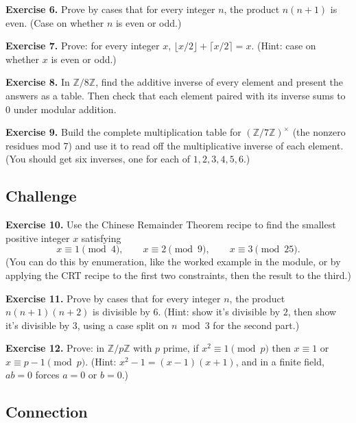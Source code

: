 \documentclass[11pt]{article}
\begin{document}
\textbf{Exercise 6.}\label{ex:m6:6} Prove by cases that for every integer $n$, the product $n(n + 1)$ is even. (Case on whether $n$ is even or odd.)

\bigskip
\textbf{Exercise 7.}\label{ex:m6:7} Prove: for every integer $x$, $\lfloor x / 2 \rfloor + \lceil x / 2 \rceil = x$. (Hint: case on whether $x$ is even or odd.)

\bigskip
\textbf{Exercise 8.}\label{ex:m6:8} In $\mathbb{Z}/8\mathbb{Z}$, find the additive inverse of every element and present the answers as a table. Then check that each element paired with its inverse sums to $0$ under modular addition.

\bigskip
\textbf{Exercise 9.}\label{ex:m6:9} Build the complete multiplication table for $(\mathbb{Z}/7\mathbb{Z})^{\times}$ (the nonzero residues mod 7) and use it to read off the multiplicative inverse of each element. (You should get six inverses, one for each of $1, 2, 3, 4, 5, 6$.)

\subsection*{Challenge}

\textbf{Exercise 10.}\label{ex:m6:10} Use the Chinese Remainder Theorem recipe to find the smallest positive integer $x$ satisfying
\[
  x \equiv 1 \pmod 4, \qquad x \equiv 2 \pmod 9, \qquad x \equiv 3 \pmod{25}.
\]
(You can do this by enumeration, like the worked example in the module, or by applying the CRT recipe to the first two constraints, then the result to the third.)

\bigskip
\textbf{Exercise 11.}\label{ex:m6:11} Prove by cases that for every integer $n$, the product $n(n+1)(n+2)$ is divisible by $6$. (Hint: show it's divisible by $2$, then show it's divisible by $3$, using a case split on $n \bmod 3$ for the second part.)

\bigskip
\textbf{Exercise 12.}\label{ex:m6:12} Prove: in $\mathbb{Z}/p\mathbb{Z}$ with $p$ prime, if $x^2 \equiv 1 \pmod p$ then $x \equiv 1$ or $x \equiv p - 1 \pmod p$. (Hint: $x^2 - 1 = (x - 1)(x + 1)$, and in a finite field, $ab = 0$ forces $a = 0$ or $b = 0$.)

\subsection*{Connection}
\end{document}
